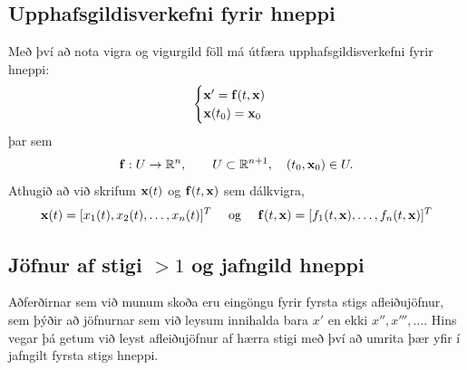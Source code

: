 \documentclass[letterpaper,10pt,icelandic]{sphinxmanual}
\begin{document}
\subsection{Upphafsgildisverkefni fyrir hneppi}
\label{kafli06:upphafsgildisverkefni-fyrir-hneppi}
Með því að nota vigra og vigurgild föll má útfæra upphafsgildisverkefni fyrir hneppi:
\begin{gather}
\begin{split}\begin{cases}
{\mbox{${\bf x}$}}' ={\mbox{${\bf f}$}}(t,{\mbox{${\bf x}$}})\\
{\mbox{${\bf x}$}}(t_0) = {\mbox{${\bf x}$}}_0
\end{cases}\end{split}\notag
\end{gather}
þar sem
\begin{gather}
\begin{split}{\mbox{${\bf f}$}}: U \rightarrow {{\mathbb  R}}^n, \qquad U\subset \mathbb{R}^{n+1}, \quad
(t_0,{\mbox{${\bf x}$}}_0) \in U.\end{split}\notag
\end{gather}
Athugið að við skrifum \({\mbox{${\bf x}$}}(t)\) og
\({\mbox{${\bf f}$}}(t,{\mbox{${\bf x}$}})\) sem dálkvigra,
\begin{gather}
\begin{split}{\mbox{${\bf x}$}}(t) = [x_1(t), x_2(t), \ldots , x_n(t)]^T
\quad \text{  og } \quad
{\mbox{${\bf f}$}}(t,{\mbox{${\bf x}$}}) = [f_1(t,{\mbox{${\bf x}$}}), \ldots , f_n(t, {\mbox{${\bf x}$}})]^T\end{split}\notag
\end{gather}

\subsection{Jöfnur af stigi \(>1\) og jafngild hneppi}
\label{kafli06:jofnur-af-stigi-og-jafngild-hneppi}\label{kafli06:index-3}
Aðferðirnar sem við munum skoða eru eingöngu fyrir fyrsta stigs afleiðujöfnur,
sem þýðir að jöfnurnar sem við leysum
innihalda bara \(x'\) en ekki \(x'',x''',\ldots\).
Hins vegar þá getum við leyst afleiðujöfnur af hærra stigi með því að umrita þær yfir í jafngilt
fyrsta stigs hneppi.
\end{document}
